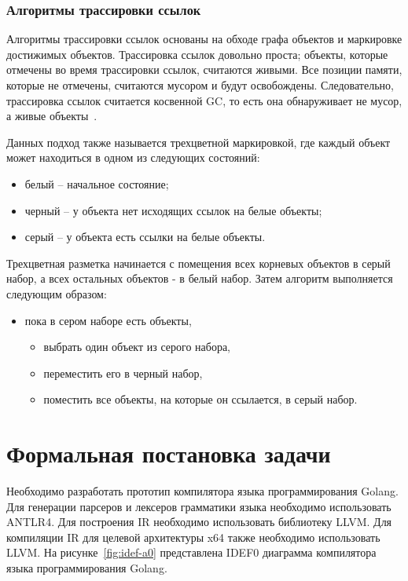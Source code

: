 \subsubsection*{Алгоритмы трассировки ссылок}

Алгоритмы трассировки ссылок основаны на обходе графа объектов и маркировке достижимых объектов.
Трассировка ссылок довольно проста; объекты, которые отмечены во время трассировки ссылок, считаются живыми.
Все позиции памяти, которые не отмечены, считаются мусором и будут освобождены.
Следовательно, трассировка ссылок считается косвенной GC, то есть она обнаруживает не мусор, а живые объекты~\cite{mccarthy1960recursive}.

Данных подход также называется трехцветной маркировкой, где каждый объект может находиться в одном из следующих состояний:
\begin{itemize}
    \item белый -- начальное состояние;
    \item черный -- у объекта нет исходящих ссылок на белые объекты;
    \item серый -- у объекта есть ссылки на белые объекты.
\end{itemize}

Трехцветная разметка начинается с помещения всех корневых объектов в серый набор, а всех остальных объектов - в белый набор.
Затем алгоритм выполняется следующим образом:
\begin{itemize}
    \item пока в сером наборе есть объекты,
    \begin{itemize}
        \item выбрать один объект из серого набора,
        \item переместить его в черный набор,
        \item поместить все объекты, на которые он ссылается, в серый набор.
    \end{itemize}
\end{itemize}


\section{Формальная постановка задачи}

Необходимо разработать прототип компилятора языка программирования Golang.
Для генерации парсеров и лексеров грамматики языка необходимо использовать ANTLR4.
Для построения IR необходимо использовать библиотеку LLVM.
Для компиляции IR для целевой архитектуры x64 также необходимо использовать LLVM.
На рисунке~\ref{fig:idef-a0} представлена IDEF0 диаграмма компилятора языка программирования Golang.

